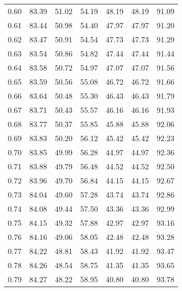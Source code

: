 \begin{tabular}{|c|c|c|c|c|c|c|}
      0.60 &     83.39 &     51.02 &      54.19 &   48.19 &      48.19 &         91.09 \\
      0.61 &     83.44 &     50.98 &      54.40 &   47.97 &      47.97 &         91.20 \\
      0.62 &     83.47 &     50.91 &      54.54 &   47.73 &      47.73 &         91.29 \\
      0.63 &     83.54 &     50.86 &      54.82 &   47.44 &      47.44 &         91.44 \\
      0.64 &     83.58 &     50.72 &      54.97 &   47.07 &      47.07 &         91.56 \\
      0.65 &     83.59 &     50.56 &      55.08 &   46.72 &      46.72 &         91.66 \\
      0.66 &     83.64 &     50.48 &      55.30 &   46.43 &      46.43 &         91.79 \\
      0.67 &     83.71 &     50.43 &      55.57 &   46.16 &      46.16 &         91.93 \\
      0.68 &     83.77 &     50.37 &      55.85 &   45.88 &      45.88 &         92.06 \\
      0.69 &     83.83 &     50.20 &      56.12 &   45.42 &      45.42 &         92.23 \\
      0.70 &     83.85 &     49.99 &      56.28 &   44.97 &      44.97 &         92.36 \\
      0.71 &     83.88 &     49.79 &      56.48 &   44.52 &      44.52 &         92.50 \\
      0.72 &     83.96 &     49.70 &      56.84 &   44.15 &      44.15 &         92.67 \\
      0.73 &     84.04 &     49.60 &      57.28 &   43.74 &      43.74 &         92.86 \\
      0.74 &     84.08 &     49.44 &      57.50 &   43.36 &      43.36 &         92.99 \\
      0.75 &     84.15 &     49.32 &      57.88 &   42.97 &      42.97 &         93.16 \\
      0.76 &     84.16 &     49.06 &      58.05 &   42.48 &      42.48 &         93.28 \\
      0.77 &     84.22 &     48.81 &      58.43 &   41.92 &      41.92 &         93.47 \\
      0.78 &     84.26 &     48.54 &      58.75 &   41.35 &      41.35 &         93.65 \\
      0.79 &     84.27 &     48.22 &      58.95 &   40.80 &      40.80 &         93.78 \\

\end{tabular}
